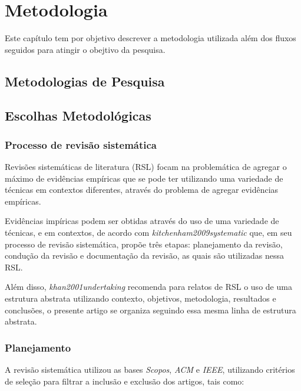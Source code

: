 \chapter[Metodologia]{Metodologia}

Este capítulo tem por objetivo descrever a metodologia utilizada além dos fluxos seguidos para atingir o obejtivo da pesquisa. 


\section{Metodologias de Pesquisa}

\section{Escolhas Metodológicas}


\subsection{Processo de revisão sistemática}

Revisões sistemáticas de literatura (RSL) focam na problemática de agregar o máximo de evidências empíricas que se pode ter utilizando uma variedade de técnicas em contextos diferentes, através do problema de agregar evidências empíricas.

Evidências impíricas podem ser obtidas através do uso de uma variedade de técnicas, e em contextos, de acordo com \textit{kitchenham2009systematic} que, em seu processo de revisão sistemática, propõe três etapas: planejamento da revisão, condução da revisão e documentação da revisão, as quais são utilizadas nessa RSL. 

\par Além disso, \textit{khan2001undertaking} recomenda para relatos de RSL o uso de uma estrutura abstrata utilizando contexto, objetivos, metodologia, resultados e conclusões, o presente artigo se organiza seguindo essa mesma linha de estrutura abstrata.

\subsection{Planejamento}
\par A revisão sistemática utilizou as bases \textit{Scopos}, \textit{ACM} e \textit{IEEE}, utilizando critérios de seleção para filtrar a inclusão e exclusão dos artigos, tais como:

